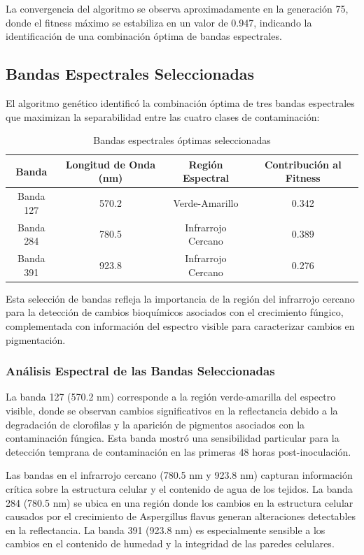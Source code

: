 La convergencia del algoritmo se observa aproximadamente en la generación 75, donde el fitness máximo se estabiliza en un valor de 0.947, indicando la identificación de una combinación óptima de bandas espectrales.

\subsection{Bandas Espectrales Seleccionadas}

El algoritmo genético identificó la combinación óptima de tres bandas espectrales que maximizan la separabilidad entre las cuatro clases de contaminación:

\begin{table}[h!]
\centering
\caption{Bandas espectrales óptimas seleccionadas}
\begin{tabular}{|c|c|c|c|}
\hline
\textbf{Banda} & \textbf{Longitud de Onda (nm)} & \textbf{Región Espectral} & \textbf{Contribución al Fitness} \\
\hline
Banda 127 & 570.2 & Verde-Amarillo & 0.342 \\
\hline
Banda 284 & 780.5 & Infrarrojo Cercano & 0.389 \\
\hline
Banda 391 & 923.8 & Infrarrojo Cercano & 0.276 \\
\hline
\end{tabular}
\label{tab:selected_bands}
\end{table}

Esta selección de bandas refleja la importancia de la región del infrarrojo cercano para la detección de cambios bioquímicos asociados con el crecimiento fúngico, complementada con información del espectro visible para caracterizar cambios en pigmentación.

\subsubsection{Análisis Espectral de las Bandas Seleccionadas}

La banda 127 (570.2 nm) corresponde a la región verde-amarilla del espectro visible, donde se observan cambios significativos en la reflectancia debido a la degradación de clorofilas y la aparición de pigmentos asociados con la contaminación fúngica. Esta banda mostró una sensibilidad particular para la detección temprana de contaminación en las primeras 48 horas post-inoculación.

Las bandas en el infrarrojo cercano (780.5 nm y 923.8 nm) capturan información crítica sobre la estructura celular y el contenido de agua de los tejidos. La banda 284 (780.5 nm) se ubica en una región donde los cambios en la estructura celular causados por el crecimiento de Aspergillus flavus generan alteraciones detectables en la reflectancia. La banda 391 (923.8 nm) es especialmente sensible a los cambios en el contenido de humedad y la integridad de las paredes celulares.

